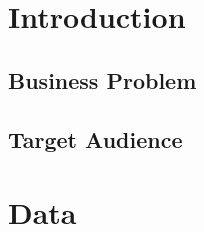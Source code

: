 \documentclass{article}
\begin{document}


\section{Introduction}

\subsection{Business Problem}

\subsection{Target Audience}

\section{Data}
\end{document}
